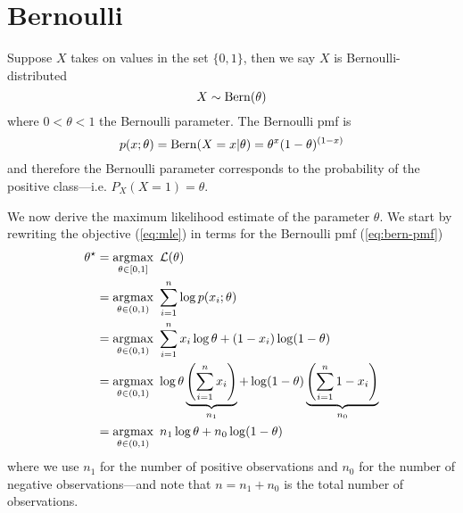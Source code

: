 \section{Bernoulli}

Suppose $X$ takes on values in the set $\{0, 1\}$, then we say $X$ is Bernoulli-distributed 
\begin{equation}\label{eq:bern-pmf}
X \sim \operatorname{Bern}(\theta)
\end{equation}
where $0 < \theta < 1$ the Bernoulli parameter.
The Bernoulli pmf is
\begin{equation}
p(x; \theta) = \operatorname{Bern}(X=x|\theta) = \theta^x (1-\theta)^{(1-x)}
\end{equation}
and therefore the Bernoulli parameter corresponds to the probability of the positive class---i.e. $P_X(X=1)=\theta$.

We now derive the maximum likelihood estimate of the parameter $\theta$.
We start by rewriting the objective (\ref{eq:mle}) in terms for the Bernoulli  pmf (\ref{eq:bern-pmf})
\begin{subequations}
\begin{align}
\theta^\star &= \operatorname*{\arg\!\max}_{\theta \in [0, 1]} ~ \mathcal L(\theta)  \\
 &= \operatorname*{\arg\!\max}_{\theta \in (0, 1)} ~ \sum_{i=1}^n \log p(x_i; \theta) \label{bern:pmf-in}\\
 &= \operatorname*{\arg\!\max}_{\theta \in (0, 1)} ~ \sum_{i=1}^n x_i \log \theta + (1-x_i)\log (1-\theta) \label{bern:log-property} \\
 &= \operatorname*{\arg\!\max}_{\theta \in (0, 1)} ~ \log \theta \underbrace{\left(\sum_{i=1}^n x_i \right)}_{n_1} + \log (1-\theta) \underbrace{\left(\sum_{i=1}^n 1 - x_i\right)}_{n_0} \\
 &= \operatorname*{\arg\!\max}_{\theta \in (0, 1)} ~ n_1 \log \theta + n_0 \log (1-\theta)
\end{align}
\end{subequations}
where we use $n_1$ for the number of positive observations and $n_0$ for the number of negative observations---and note that $n=n_1 + n_0$ is the total number of observations.

